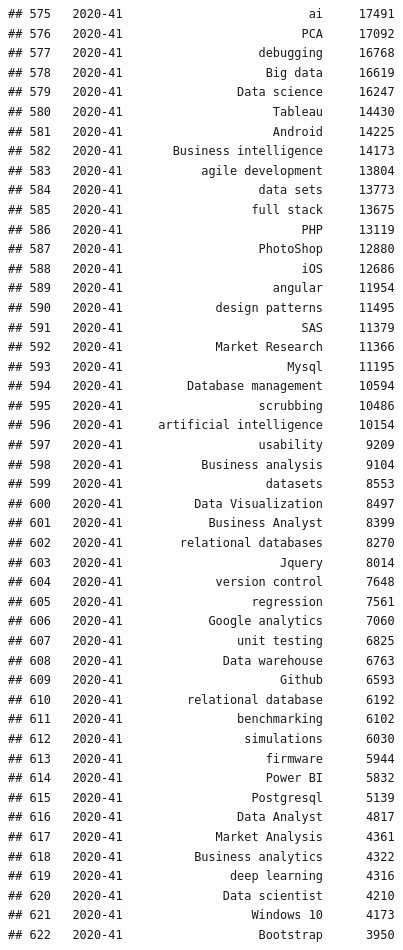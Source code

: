 \documentclass[
]{article}
\begin{document}
\begin{verbatim}
## 575   2020-41                          ai     17491
## 576   2020-41                         PCA     17092
## 577   2020-41                   debugging     16768
## 578   2020-41                    Big data     16619
## 579   2020-41                Data science     16247
## 580   2020-41                     Tableau     14430
## 581   2020-41                     Android     14225
## 582   2020-41       Business intelligence     14173
## 583   2020-41           agile development     13804
## 584   2020-41                   data sets     13773
## 585   2020-41                  full stack     13675
## 586   2020-41                         PHP     13119
## 587   2020-41                   PhotoShop     12880
## 588   2020-41                         iOS     12686
## 589   2020-41                     angular     11954
## 590   2020-41             design patterns     11495
## 591   2020-41                         SAS     11379
## 592   2020-41             Market Research     11366
## 593   2020-41                       Mysql     11195
## 594   2020-41         Database management     10594
## 595   2020-41                   scrubbing     10486
## 596   2020-41     artificial intelligence     10154
## 597   2020-41                   usability      9209
## 598   2020-41           Business analysis      9104
## 599   2020-41                    datasets      8553
## 600   2020-41          Data Visualization      8497
## 601   2020-41            Business Analyst      8399
## 602   2020-41        relational databases      8270
## 603   2020-41                      Jquery      8014
## 604   2020-41             version control      7648
## 605   2020-41                  regression      7561
## 606   2020-41            Google analytics      7060
## 607   2020-41                unit testing      6825
## 608   2020-41              Data warehouse      6763
## 609   2020-41                      Github      6593
## 610   2020-41         relational database      6192
## 611   2020-41                benchmarking      6102
## 612   2020-41                 simulations      6030
## 613   2020-41                    firmware      5944
## 614   2020-41                    Power BI      5832
## 615   2020-41                  Postgresql      5139
## 616   2020-41                Data Analyst      4817
## 617   2020-41             Market Analysis      4361
## 618   2020-41          Business analytics      4322
## 619   2020-41               deep learning      4316
## 620   2020-41              Data scientist      4210
## 621   2020-41                  Windows 10      4173
## 622   2020-41                   Bootstrap      3950

\end{verbatim}
\end{document}
